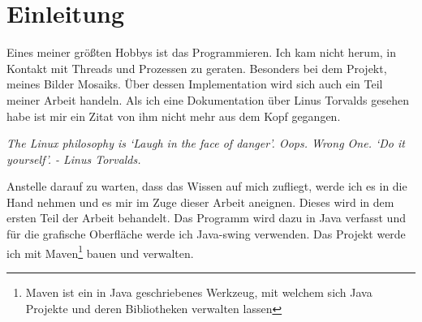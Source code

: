 \section{Einleitung}
Eines meiner größten Hobbys ist das Programmieren. Ich kam nicht herum, in Kontakt mit Threads und Prozessen zu geraten. Besonders bei dem Projekt, meines Bilder Mosaiks. Über dessen Implementation wird sich auch ein Teil meiner Arbeit handeln. Als ich eine Dokumentation über Linus Torvalds gesehen habe ist mir ein Zitat von ihm nicht mehr aus dem Kopf gegangen.\\
\begin{center}
    \textit{The Linux philosophy is ‘Laugh in the face of danger’. Oops. Wrong One. ‘Do it yourself’. - Linus Torvalds.}
\end{center}
Anstelle darauf zu warten, dass das Wissen auf mich zufliegt, werde ich es in die Hand nehmen und es mir im Zuge dieser Arbeit aneignen. Dieses wird in dem ersten Teil der Arbeit behandelt. Das Programm wird dazu in Java verfasst und für die grafische Oberfläche werde ich Java-swing verwenden. Das Projekt werde ich mit Maven\footnote{Maven ist ein in Java geschriebenes Werkzeug, mit welchem sich Java Projekte und deren Bibliotheken verwalten lassen} bauen und verwalten.